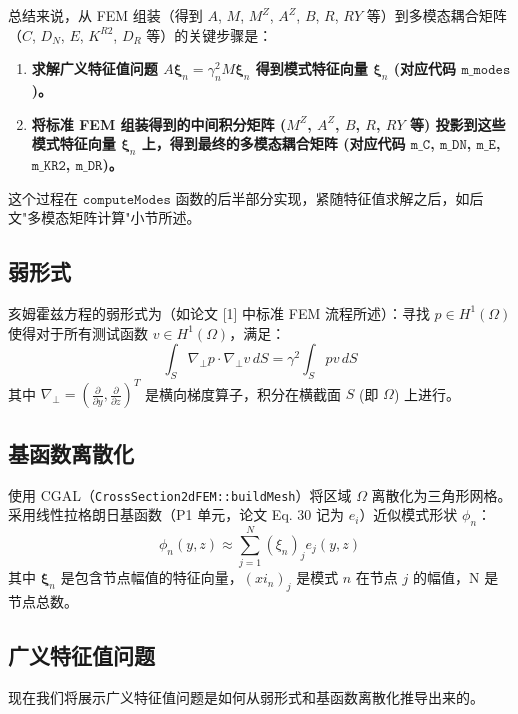 \documentclass{ctexart}
\begin{document}
总结来说，从 FEM 组装（得到 $A$, $M$, $M^Z$, $A^Z$, $B$, $R$, $RY$ 等）到多模态耦合矩阵（$C$, $D_N$, $E$, $K^{R2}$, $D_R$ 等）的关键步骤是：
\begin{enumerate}
    \item \textbf{求解广义特征值问题 $A \boldsymbol{\xi}_n = \gamma_n^2 M \boldsymbol{\xi}_n$ 得到模式特征向量 $\boldsymbol{\xi}_n$ (对应代码 $\texttt{m\_modes}$)。}
    \item \textbf{将标准 FEM 组装得到的中间积分矩阵 ($M^Z$, $A^Z$, $B$, $R$, $RY$ 等) 投影到这些模式特征向量 $\boldsymbol{\xi}_n$ 上，得到最终的多模态耦合矩阵 (对应代码 $\texttt{m\_C}$, $\texttt{m\_DN}$, $\texttt{m\_E}$, $\texttt{m\_KR2}$, $\texttt{m\_DR}$)。}
\end{enumerate}

这个过程在 $\texttt{computeModes}$ 函数的后半部分实现，紧随特征值求解之后，如后文"多模态矩阵计算"小节所述。

\subsection{弱形式}
亥姆霍兹方程的弱形式为（如论文 [1] 中标准 FEM 流程所述）：寻找 $p \in H^1(\Omega)$ 使得对于所有测试函数 $v \in H^1(\Omega)$，满足：
\begin{equation} \label{eq:weak_form}
\int_S \nabla_\perp p \cdot \nabla_\perp v \, dS = \gamma^2 \int_S p v \, dS
\end{equation}
其中 $\nabla_\perp = (\frac{\partial}{\partial y}, \frac{\partial}{\partial z})^T$ 是横向梯度算子，积分在横截面 $S$ (即 $\Omega$) 上进行。

\subsection{基函数离散化}
使用 CGAL（\texttt{CrossSection2dFEM::buildMesh}）将区域 $\Omega$ 离散化为三角形网格。采用线性拉格朗日基函数（P1 单元，论文 Eq. 30 记为 $e_i$）近似模式形状 $\phi_n$：
\begin{equation} \label{eq:fem_approx}
\phi_n(y,z) \approx \sum_{j=1}^{N} (\xi_n)_j e_j(y,z)
\end{equation}
其中 $\boldsymbol{\xi}_n$ 是包含节点幅值的特征向量，$(xi_n)_j$ 是模式 $n$ 在节点 $j$ 的幅值，N 是节点总数。

\subsection{广义特征值问题}
现在我们将展示广义特征值问题是如何从弱形式和基函数离散化推导出来的。
\end{document}
